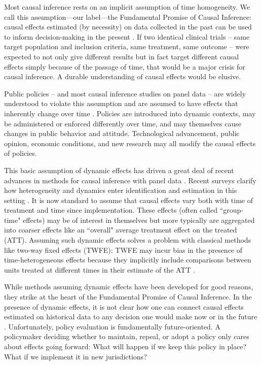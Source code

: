 \documentclass{article}
\begin{document}
Most causal inference rests on an implicit assumption of time homogeneity. We call this assumption---our label---the Fundamental Promise of Causal Inference: causal effects estimated (by necessity) on data collected in the past can be used to inform decision-making in the present \citep{egamiElementsExternalValidity2023,khosrowiExtrapolationCausalEffects2019,cartwrightHuntingCausesUsing2007}. If two identical clinical trials -- same target population and inclusion criteria, same treatment, same outcome -- were expected to not only give different results but in fact target different causal effects simply because of the passage of time, that would be a major crisis for causal inference. A durable understanding of causal effects would be elusive.

Public policies -- and most causal inference studies on panel data -- are widely understood to violate this assumption and are assumed to have effects that inherently change over time \citep{lucasjrEconometricPolicyEvaluation1976,ericssonExogeneityCointegrationEconomic1998,estrellaAreDeepParameters1999}. Policies are introduced into dynamic contexts, may be administered or enforced differently over time, and may themselves cause changes in public behavior and attitude. Technological advancement, public opinion, economic conditions, and new research may all modify the causal effects of policies.

This basic assumption of dynamic effects has driven a great deal of recent advances in methods for causal inference with panel data \citep{wangAdvancesDifferenceindifferencesMethods2024a}. Recent surveys clarify how heterogeneity and dynamics enter identification and estimation in this setting \citep{arkhangelskyCausalModelsLongitudinal2024,dechaisemartinTwowayFixedEffects2023}. It is now standard to assume that causal effects vary both with time of treatment and time since implementation. These effects (often called ``group-time" effects) may be of interest in themselves but more typically are aggregated into coarser effects like an ``overall" average treatment effect on the treated (ATT). Assuming such dynamic effects solves a problem with classical methods like two-way fixed effects (TWFE): TWFE may incur bias in the presence of time-heterogeneous effects because they implicitly include comparisons between units treated at different times in their estimate of the ATT \citep{sunEstimatingDynamicTreatment2021}.

While methods assuming dynamic effects have been developed for good reasons, they strike at the heart of the Fundamental Promise of Causal Inference. In the presence of dynamic effects, it is not clear how one can connect causal effects estimated on historical data to any decision one would make now or in the future \citep{egamiElementsExternalValidity2023,devauxQuantifyingRobustnessExternal2022,khosrowiExtrapolationCausalEffects2019}. Unfortunately, policy evaluation is fundamentally future-oriented. A policymaker deciding whether to maintain, repeal, or adopt a policy only cares about effects going forward: What will happen if we keep this policy in place? What if we implement it in new jurisdictions?
\end{document}
